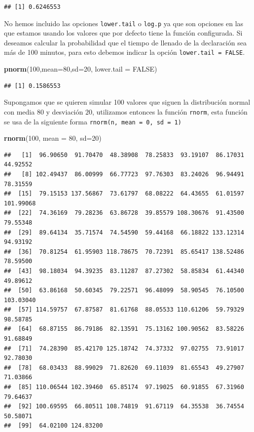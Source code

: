 \documentclass[letterpaper,]{book}
\newenvironment{Shaded}{\begin{snugshade}}{\end{snugshade}}
\newcommand{\DataTypeTok}[1]{\textcolor[rgb]{0.13,0.29,0.53}{#1}}
\newcommand{\DecValTok}[1]{\textcolor[rgb]{0.00,0.00,0.81}{#1}}
\newcommand{\KeywordTok}[1]{\textcolor[rgb]{0.13,0.29,0.53}{\textbf{#1}}}
\newcommand{\NormalTok}[1]{#1}
\newcommand{\OtherTok}[1]{\textcolor[rgb]{0.56,0.35,0.01}{#1}}
\begin{document}
\begin{verbatim}
## [1] 0.6246553
\end{verbatim}

No hemos incluido las opciones \texttt{lower.tail} o \texttt{log.p} ya que son opciones en las que estamos usando los valores que por defecto tiene la función configurada. Si deseamos calcular la probabilidad que el tiempo de llenado de la declaración sea más de 100 minutos, para esto debemos indicar la opción \texttt{lower.tail\ =\ FALSE}.

\begin{Shaded}
\begin{Highlighting}[]
\KeywordTok{pnorm}\NormalTok{(}\DecValTok{100}\NormalTok{,}\DataTypeTok{mean=}\DecValTok{80}\NormalTok{,}\DataTypeTok{sd=}\DecValTok{20}\NormalTok{, }\DataTypeTok{lower.tail =} \OtherTok{FALSE}\NormalTok{)}
\end{Highlighting}
\end{Shaded}

\begin{verbatim}
## [1] 0.1586553
\end{verbatim}

Supongamos que se quieren simular 100 valores que siguen la distribución normal con media \(80\) y desviación \(20\), utilizamos entonces la función \texttt{rnorm}, esta función se usa de la siguiente forma \texttt{rnorm(n,\ mean\ =\ 0,\ sd\ =\ 1)}

\begin{Shaded}
\begin{Highlighting}[]
\KeywordTok{rnorm}\NormalTok{(}\DecValTok{100}\NormalTok{, }\DataTypeTok{mean =} \DecValTok{80}\NormalTok{, }\DataTypeTok{sd=}\DecValTok{20}\NormalTok{)}
\end{Highlighting}
\end{Shaded}

\begin{verbatim}
##   [1]  96.90650  91.70470  48.38908  78.25833  93.19107  86.17031  44.92552
##   [8] 102.49437  86.00999  66.77723  97.76303  83.24026  96.94491  78.31559
##  [15]  79.15153 137.56867  73.61797  68.08222  64.43655  61.01597 101.99068
##  [22]  74.36169  79.28236  63.86728  39.85579 108.30676  91.43500  79.55348
##  [29]  89.64134  35.71574  74.54590  59.44168  66.18822 133.12314  94.93192
##  [36]  70.81254  61.95903 118.78675  70.72391  85.65417 138.52486  78.59500
##  [43]  98.18034  94.39235  83.11287  87.27302  58.85834  61.44340  49.89612
##  [50]  63.86168  50.60345  79.22571  96.48099  58.90545  76.10500 103.03040
##  [57] 114.59757  67.87587  81.61768  88.05533 110.61206  59.79329  98.58785
##  [64]  68.87155  86.79186  82.13591  75.13162 100.90562  83.58226  91.68849
##  [71]  74.28390  85.42170 125.18742  74.37332  97.02755  73.91017  92.78030
##  [78]  68.03433  88.99029  71.82620  69.11039  81.65543  49.27907  71.03866
##  [85] 110.06544 102.39460  65.85174  97.19025  60.91855  67.31960  79.64637
##  [92] 100.69595  66.80511 108.74819  91.67119  64.35538  36.74554  50.58071
##  [99]  64.02100 124.83200
\end{verbatim}
\end{document}
